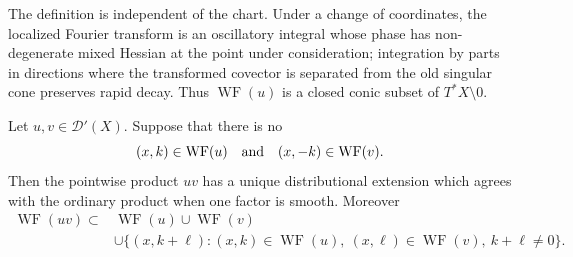 The definition is independent of the chart.  Under a change of coordinates,
the localized Fourier transform is an oscillatory integral whose phase has
non-degenerate mixed Hessian at the point under consideration; integration
by parts in directions where the transformed covector is separated from the
old singular cone preserves rapid decay.  Thus \(\operatorname{WF}(u)\) is a
closed conic subset of \(T^*X\setminus0\).

\begin{theorem}
\label{thm:microlocal-product-criterion}
Let \(u,v\in\mathcal D'(X)\).  Suppose that there is no
\begin{equation}
  (x,k)\in\operatorname{WF}(u)
  \quad\hbox{and}\quad
  (x,-k)\in\operatorname{WF}(v).
  \label{eq:microlocal-no-opposite-covectors}
\end{equation}
Then the pointwise product \(uv\) has a unique distributional extension
which agrees with the ordinary product when one factor is smooth.  Moreover
\begin{equation}
\begin{aligned}
  \operatorname{WF}(uv)
  \subset&
  \operatorname{WF}(u)\cup\operatorname{WF}(v)\\
  &\cup
  \{(x,k+\ell):(x,k)\in\operatorname{WF}(u),\
        (x,\ell)\in\operatorname{WF}(v),\ k+\ell\ne0\}.
\end{aligned}
  \label{eq:microlocal-product-wavefront-bound}
\end{equation}
\end{theorem}

